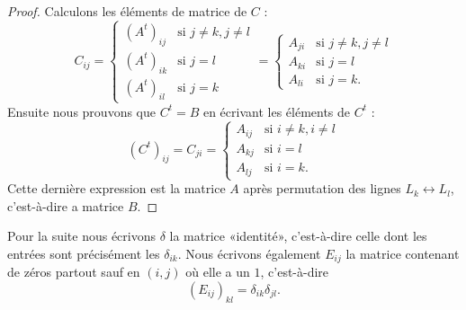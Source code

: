 \begin{proof}
    Calculons les éléments de matrice de \( C\) :
    \begin{equation}
        C_{ij}=\begin{cases}
            (A^t)_{ij}    &   \text{si }  j\neq k, j\neq l\\
            (A^t)_{ik}    &   \text{si } j=l\\
            (A^t)_{il}    &    \text{si }j=k
        \end{cases}=
        \begin{cases}
            A_{ji}    &   \text{si }  j\neq k, j\neq l\\
            A_{ki}    &   \text{si } j=l\\
            A_{li}    &    \text{si }j=k.
        \end{cases}
    \end{equation}
    Ensuite nous prouvons que \( C^t=B\) en écrivant les éléments de \( C^t\) :
    \begin{equation}
        (C^t)_{ij}=C_{ji}=\begin{cases}
            A_{ij}    &   \text{si } i\neq k, i\neq l\\
            A_{kj}    &   \text{si } i=l\\
            A_{lj}    &    \text{si }i=k.
        \end{cases}
    \end{equation}
    Cette dernière expression est la matrice \( A\) après permutation des lignes \( L_k\leftrightarrow L_l\), c'est-à-dire a matrice \( B\).
\end{proof}

Pour la suite nous écrivons \( \delta\) la matrice «identité», c'est-à-dire celle dont les entrées sont précisément les \( \delta_{ik}\).  Nous écrivons également \( E_{ij}\) la matrice contenant de zéros partout sauf en \( (i,j)\) où elle a un \( 1\), c'est-à-dire
\begin{equation}
    (E_{ij})_{kl}=\delta_{ik}\delta_{jl}.
\end{equation}

